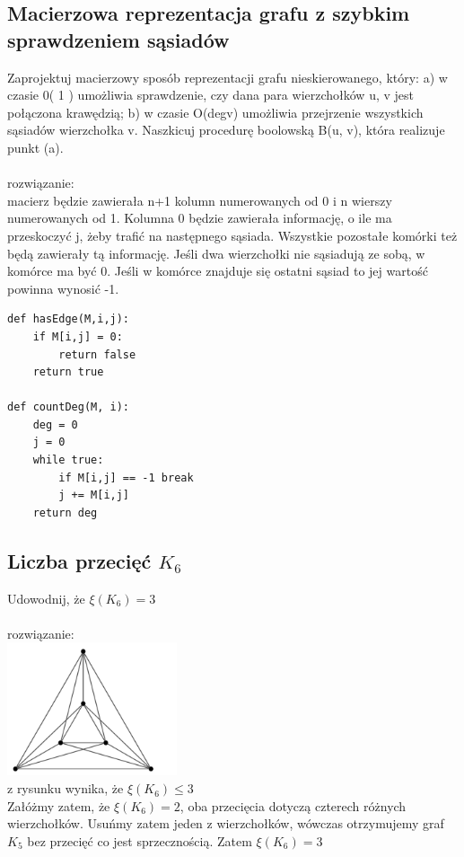\documentclass{article}
\begin{document}
\subsection*{Macierzowa reprezentacja grafu z szybkim sprawdzeniem sąsiadów}
Zaprojektuj macierzowy sposób reprezentacji grafu nieskierowanego, który:
a) w czasie 0( 1 ) umożliwia sprawdzenie, czy dana para wierzchołków u, v jest połączona krawędzią;
b) w czasie O(degv) umożliwia przejrzenie wszystkich sąsiadów wierzchołka v. Naszkicuj
procedurę boolowską B(u, v), która realizuje punkt (a). \\\\rozwiązanie:\\
macierz będzie zawierała n+1 kolumn numerowanych od 0 i n wierszy numerowanych od 1.
Kolumna 0 będzie zawierała informację,  o ile ma przeskoczyć j, żeby trafić na następnego sąsiada. 
Wszystkie pozostałe komórki też będą zawierały tą informację.  Jeśli dwa wierzchołki nie sąsiadują ze sobą,  w komórce ma być 0. 
Jeśli w komórce znajduje się ostatni sąsiad to jej wartość powinna wynosić -1. 

\begin{lstlisting}
def hasEdge(M,i,j):
	if M[i,j] = 0:
		return false
	return true

def countDeg(M, i):
	deg = 0
	j = 0
	while true:
		if M[i,j] == -1 break
		j += M[i,j]
 	return deg

\end{lstlisting}



\subsection*{Liczba przecięć $K_6$}
Udowodnij, że $\xi(K_6) = 3$ \\\\rozwiązanie: \\
\includegraphics[width=5cm]{k6}\\
z rysunku wynika, że $\xi(K_6) \leq 3$ \\
Załóżmy zatem, że $\xi(K_6) = 2$, oba przecięcia dotyczą czterech różnych wierzchołków.  
Usuńmy zatem jeden z wierzchołków, wówczas otrzymujemy graf $K_5$ bez przecięć co jest sprzecznością.
Zatem $\xi(K_6)=3$
\end{document}
